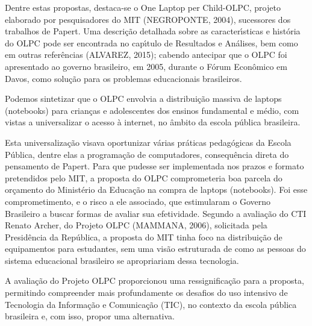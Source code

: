 \documentclass[
12pt,		%
openright,	%
twoside,  %
a4paper,			%
chapter=TITLE,		%
english,			%
french,				%
spanish,			%
brazil				%
]{USPSC-classe/USPSC}
\begin{document}
Dentre estas propostas, destaca-se o \textquotedbl One Laptop per Child-OLPC\textquotedbl , projeto elaborado por pesquisadores do MIT  (NEGROPONTE, 2004), sucessores dos trabalhos de Papert. Uma descri\c{c}\~ao detalhada sobre as caracter\'{\i}sticas e hist\'oria do OLPC pode ser encontrada no cap\'{\i}tulo de Resultados e An\'alises, bem como em outras refer\^encias  (ALVAREZ, 2015); cabendo antecipar que o OLPC foi apresentado ao governo brasileiro, em 2005, durante o F\'orum Econ\^omico em Davos, como solu\c{c}\~ao para os problemas educacionais brasileiros.








Podemos sintetizar que o OLPC envolvia a distribui\c{c}\~ao massiva de laptops (notebooks) para crian\c{c}as e adolescentes dos ensinos fundamental e m\'edio, com vistas a universalizar o acesso \`a internet, no \^ambito da escola p\'ublica brasileira.








Esta universaliza\c{c}\~ao visava oportunizar v\'arias pr\'aticas pedag\'ogicas da Escola P\'ublica, dentre elas a programa\c{c}\~ao de computadores, consequ\^encia direta do pensamento de Papert. Para que pudesse ser implementada nos prazos e formato pretendidos pelo MIT, a proposta do OLPC comprometeria boa parcela do or\c{c}amento do Minist\'erio da Educa\c{c}\~ao na compra de laptops (notebooks). Foi esse comprometimento, e o risco a ele associado, que estimularam o Governo Brasileiro a buscar formas de avaliar sua efetividade. Segundo a avalia\c{c}\~ao do CTI Renato Archer, do Projeto OLPC  (MAMMANA, 2006), solicitada pela Presid\^encia da Rep\'ublica, a proposta do MIT tinha foco na distribui\c{c}\~ao de equipamentos para estudantes, sem uma vis\~ao estruturada de como as pessoas do sistema educacional brasileiro se apropriariam dessa tecnologia.








A avalia\c{c}\~ao do Projeto OLPC proporcionou uma ressignifica\c{c}\~ao para a proposta, permitindo compreender mais profundamente os desafios do uso intensivo de Tecnologia da Informa\c{c}\~ao e Comunica\c{c}\~ao (TIC), no contexto da escola p\'ublica brasileira e, com isso, propor uma alternativa.
\end{document}
